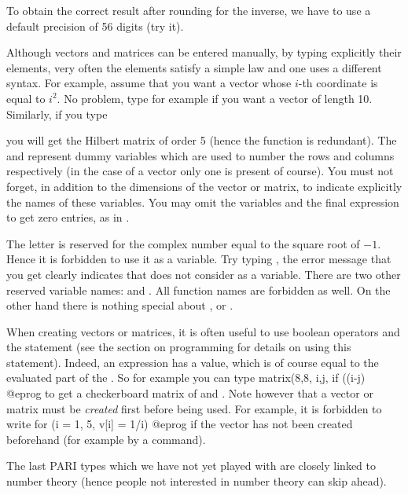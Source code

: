 To obtain the correct result after rounding for the inverse, we have to use a
default precision of 56 digits (try it).
\smallskip

Although vectors and matrices can be entered manually, by typing explicitly
their elements, very often the elements satisfy a simple law and one uses a
different syntax. For example, assume that you want a vector whose $i$-th
coordinate is equal to $i^2$. No problem, type for example
 if you want a vector of length 10. Similarly, if
you type

\centerline{}

\noindent you will get the Hilbert matrix of order 5 (hence the
 function is redundant).  The  and  represent
dummy variables which are used to number the rows and columns respectively
(in the case of a vector only one is present of course). You must not forget,
in addition to the dimensions of the vector or matrix, to indicate explicitly
the names of these variables. You may omit the variables and the final
expression to get zero entries, as in .

 The letter  is reserved for the complex number
equal to the square root of $-1$. Hence it is forbidden to use it as a
variable. Try typing , the error message that you
get clearly indicates that  does not consider  as a variable.
There are two other reserved variable names:  and . All
function names are forbidden as well. On the other hand there is nothing
special about ,  or .

When creating vectors or matrices, it is often useful to use boolean
operators and the  statement (see the section on programming for
details on using this statement). Indeed, an  expression has a value,
which is of course equal to the evaluated part of the . So for
example you can type
\bprog
matrix(8,8, i,j, if ((i-j)%
@eprog
\noindent to get a checkerboard matrix of  and . Note however
that a vector or matrix must be {\it created} first before being used. For
example, it is forbidden to write
\bprog
for (i = 1, 5, v[i] = 1/i)
@eprog
\noindent if the vector  has not been created beforehand (for example
by a  command).

\medskip The last PARI types which we have not yet played with are closely
linked to number theory (hence people not interested in number theory can
skip ahead).

